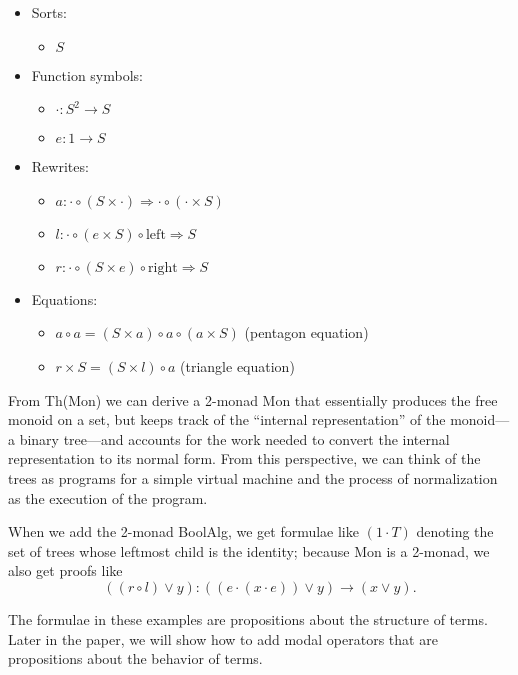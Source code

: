 \documentclass{article}
\newcommand{\maps}{\colon}
\renewcommand{\left}{\mathrm{left}}
\renewcommand{\right}{\mathrm{right}}
\begin{document}
\begin{center}
  \begin{itemize}
    \item Sorts:
    \begin{itemize}
      \item $S$
    \end{itemize}
    \item Function symbols:
    \begin{itemize}
      \item $\cdot\maps S^2 \to S$
      \item $e\maps 1 \to S$
    \end{itemize}
    \item Rewrites:
    \begin{itemize}
      \item $a\maps \cdot \circ (S \times \cdot) \Rightarrow \cdot \circ (\cdot \times S)$
      \item $l\maps \cdot \circ (e \times S) \circ \left \Rightarrow S$
      \item $r\maps \cdot \circ (S \times e) \circ \right \Rightarrow S$
    \end{itemize}
    \item Equations:
    \begin{itemize}
      \item $a \circ a = (S \times a) \circ a \circ (a \times S)$ (pentagon equation)
      \item $r \times S = (S \times l) \circ a$ (triangle equation)
    \end{itemize}
  \end{itemize}
\end{center}
From Th(Mon) we can derive a 2-monad Mon that essentially produces the free monoid on a set, but keeps track of the ``internal representation'' of the monoid---a binary tree---and accounts for the work needed to convert the internal representation to its normal form.  From this perspective, we can think of the trees as programs for a simple virtual machine and the process of normalization as the execution of the program.

When we add the 2-monad BoolAlg, we get formulae like $(1 \cdot T)$ denoting the set of trees whose leftmost child is the identity; because Mon is a 2-monad, we also get proofs like 
\[ ((r \circ l) \lor y)\maps ((e \cdot (x \cdot e)) \lor y) \to (x \lor y). \]

The formulae in these examples are propositions about the structure of terms.  Later in the paper, we will show how to add modal operators that are propositions about the behavior of terms.
\end{document}
